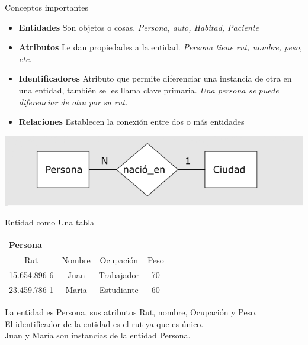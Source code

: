 \documentclass[11pt]{beamer}
\begin{document}
\begin{frame}{Conceptos importantes }
\begin{itemize}

\item \textbf{Entidades} Son objetos o cosas. \textit{Persona, auto, Habitad, Paciente}

\item \textbf{Atributos} Le dan propiedades a la entidad. \textit{Persona tiene rut, nombre, peso, etc}.

\item \textbf{Identificadores} Atributo que permite diferenciar una instancia de otra en una entidad, también se les llama clave primaria. \textit{Una persona se puede diferenciar de otra por su rut.}

\item  \textbf{Relaciones} Establecen la conexión entre dos o más entidades

\end{itemize}


\begin{center}
\includegraphics[scale=0.5]{images/rel.png} 
\end{center}


\end{frame}


\begin{frame}{Entidad como Una tabla}
\begin{table}[!H]
\begin{tabular}{|c|c|c|c|}
\hline
\multicolumn{4}{|l|}{Persona} \\ \hline
\hline 
Rut & Nombre & Ocupación & Peso \\ 
\hline 
15.654.896-6 & Juan & Trabajador & 70 \\ 
\hline 
23.459.786-1 & Maria & Estudiante & 60 \\ 
\hline 
\end{tabular} 
\end{table}

La entidad es Persona, sus atributos Rut, nombre, Ocupación y Peso.\\
El identificador de la entidad es el rut ya que es único.\\
Juan y María son instancias de la entidad Persona.\\

\end{frame}
\end{document}
